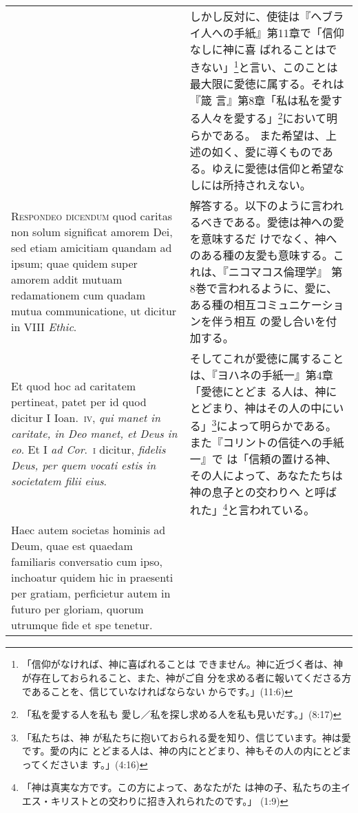 \documentclass[10pt]{jsarticle}
\begin{document}
\begin{longtable}{p{21em}p{21em}}
&

 しかし反対に、使徒は『ヘブライ人への手紙』第11章で「信仰なしに神に喜
 ばれることはできない」\footnote{「信仰がなければ、神に喜ばれることは
 できません。神に近づく者は、神が存在しておられること、また、神がご自
 分を求める者に報いてくださる方であることを、信じていなければならない
 からです。」(11:6)}と言い、このことは最大限に愛徳に属する。それは『箴
 言』第8章「私は私を愛する人々を愛する」\footnote{「私を愛する人を私も
 愛し／私を探し求める人を私も見いだす。」(8:17)}において明らかである。
 また希望は、上述の如く、愛に導くものである。ゆえに愛徳は信仰と希望な
 しには所持されえない。


\\



{\scshape Respondeo dicendum} quod caritas non solum significat amorem
Dei, sed etiam amicitiam quandam ad ipsum; quae quidem super amorem
addit mutuam redamationem cum quadam mutua communicatione, ut dicitur
 in VIII {\itshape Ethic}.

&

 解答する。以下のように言われるべきである。愛徳は神への愛を意味するだ
 けでなく、神へのある種の友愛も意味する。これは、『ニコマコス倫理学』
 第8巻で言われるように、愛に、ある種の相互コミュニケーションを伴う相互
 の愛し合いを付加する。

\\

 Et quod hoc ad caritatem pertineat, patet per id quod dicitur I
Ioan.~{\scshape iv}, {\itshape qui manet in caritate, in Deo manet, et
Deus in eo}. Et I {\itshape ad Cor}.~{\scshape i} dicitur, {\itshape
fidelis Deus, per quem vocati estis in societatem filii eius}.

&

 そしてこれが愛徳に属することは、『ヨハネの手紙一』第4章「愛徳にとどま
 る人は、神にとどまり、神はその人の中にいる」\footnote{「私たちは、神
 が私たちに抱いておられる愛を知り、信じています。神は愛です。愛の内に
 とどまる人は、神の内にとどまり、神もその人の内にとどまってくださいま
 す。」(4:16)}によって明らかである。また『コリントの信徒への手紙一』で
 は「信頼の置ける神、その人によって、あなたたちは神の息子との交わりへ
 と呼ばれた」\footnote{「神は真実な方です。この方によって、あなたがた
 は神の子、私たちの主イエス・キリストとの交わりに招き入れられたのです。」
 (1:9)}と言われている。

\\


 Haec autem societas hominis ad Deum, quae est quaedam familiaris
conversatio cum ipso, inchoatur quidem hic in praesenti per gratiam,
perficietur autem in futuro per gloriam, quorum utrumque fide et spe
tenetur.



\end{longtable}
\end{document}
